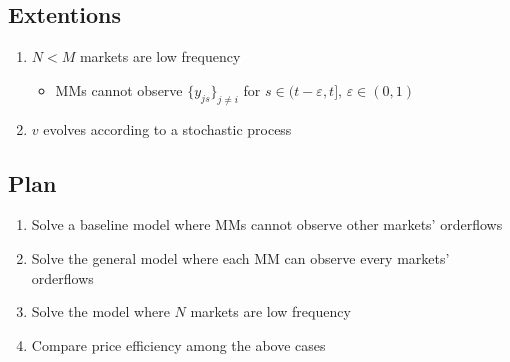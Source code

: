 \documentclass{scrartcl}
\begin{document}
			\subsection*{Extentions}
			\begin{enumerate}
				\item $N < M$ markets are low frequency 
				\begin{itemize}
					\item MMs cannot observe $\{y_{js}\}_{j\neq i} $ for $s \in (t-\varepsilon,t], \, \varepsilon \in (0,1) $ %
				\end{itemize}
				\item $v$ evolves according to a stochastic process%
			\end{enumerate}

			\subsection*{Plan}
			\begin{enumerate}
				\item Solve a baseline model where MMs cannot observe other markets' orderflows
				\item Solve the general model where each MM can observe every markets' orderflows
				\item Solve the model where $N$ markets are low frequency
				\item Compare price efficiency among the above cases  
			\end{enumerate}
\end{document}
